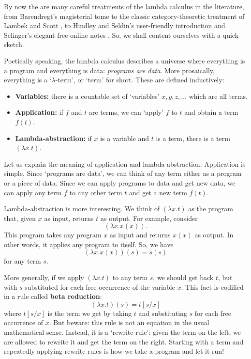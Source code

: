 \documentclass[12pt]{article}
\begin{document}
By now the are many careful treatments of the lambda calculus in 
the literature, from Barendregt's magisterial tome \cite{Barendregt}
to the classic category-theoretic treatment of Lambek and Scott
\cite{LS}, to Hindley and Seldin's user-friendly introduction 
\cite{HS} and Selinger's elegant free online notes \cite{Selinger2}.  So, 
we shall content ourselves with a quick sketch.

Poetically speaking, the lambda calculus describes a universe where
everything is a program and everything is data: {\it programs are
data}.  More prosaically, everything is a `$\lambda$-term', or `term'
for short.  These are defined inductively:
\begin{itemize}
\item {\bf Variables:}
there is a countable set of `variables' $x, y, z, \dots$
which are all terms. 
\item {\bf Application:}
if $f$ and $t$ are terms, we can `apply' $f$
to $t$ and obtain a term $f(t)$.
\item {\bf Lambda-abstraction:} if 
$x$ is a variable and $t$ is a term, there is a term 
$(\lambda x . t)$.
\end{itemize}

Let us explain the meaning of application and lambda-abstraction.
Application is simple.  Since `programs are data', we can think of any
term either as a program or a piece of data.  Since we can apply
programs to data and get new data, we can apply any term $f$ to any
other term $t$ and get a new term $f(t)$.

Lambda-abstraction is more interesting.  We think of $(\lambda x.t)$
as the program that, given $x$ as input, returns $t$ as output.  
For example, consider
\[       (\lambda x. x(x)) . \]
This program takes any program $x$ as input and returns $x(x)$ as 
output.  In other words, it applies any program to itself. 
So, we have
\[       (\lambda x . x(x))(s) = s(s) \]
for any term $s$.  

More generally, if we apply $(\lambda x . t)$ to any term $s$, 
we should get back $t$, but with $s$ substituted for each free
occurrence of the variable $x$.  This fact is codified in a rule 
called {\bf beta reduction}:
\[       (\lambda x.t)(s) = t[s/x] \]
where $t[s/x]$ is the term we get by taking $t$ and substituting $s$
for each free occurrence of $x$.  But beware: this rule is not an
equation in the usual mathematical sense.  Instead, it is a `rewrite
rule': given the term on the left, we are allowed to rewrite it and
get the term on the right.  Starting with a term and repeatedly 
applying rewrite rules is how we take a program and let it run!
\end{document}
